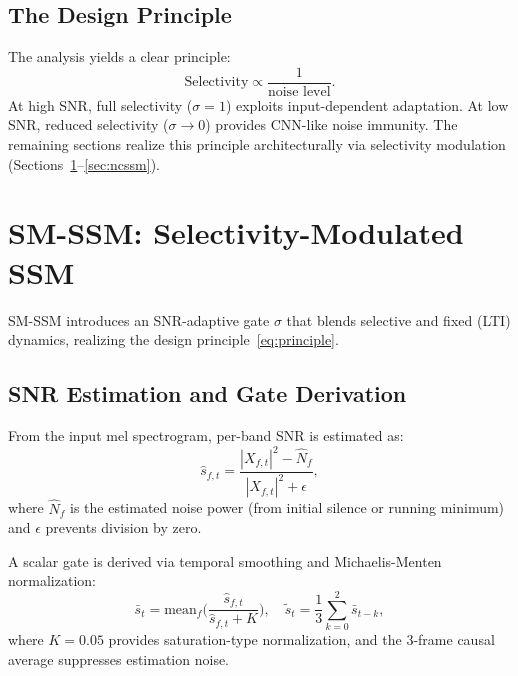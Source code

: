 \documentclass[journal]{IEEEtran}
\begin{document}
\subsection{The Design Principle}

The analysis yields a clear principle:
\begin{equation}
\boxed{\text{Selectivity} \propto \frac{1}{\text{noise level}}.}
\label{eq:principle}
\end{equation}
At high SNR, full selectivity ($\sigma = 1$) exploits input-dependent adaptation.
At low SNR, reduced selectivity ($\sigma \to 0$) provides CNN-like noise immunity.
The remaining sections realize this principle architecturally via selectivity modulation (Sections~\ref{sec:smssm}--\ref{sec:ncssm}).


\section{SM-SSM: Selectivity-Modulated SSM}
\label{sec:smssm}

SM-SSM introduces an SNR-adaptive gate $\sigma$ that blends selective and fixed (LTI) dynamics, realizing the design principle~\eqref{eq:principle}.

\subsection{SNR Estimation and Gate Derivation}

From the input mel spectrogram, per-band SNR is estimated as:
\begin{equation}
\hat{s}_{f,t} = \frac{|X_{f,t}|^2 - \hat{N}_f}{|X_{f,t}|^2 + \epsilon},
\label{eq:snr_est}
\end{equation}
where $\hat{N}_f$ is the estimated noise power (from initial silence or running minimum) and $\epsilon$ prevents division by zero.

A scalar gate is derived via temporal smoothing and Michaelis-Menten normalization:
\begin{equation}
\bar{s}_t = \text{mean}_f\!\Big(\frac{\hat{s}_{f,t}}{\hat{s}_{f,t} + K}\Big), \quad
\tilde{s}_t = \frac{1}{3}\sum_{k=0}^{2}\bar{s}_{t-k},
\label{eq:snr_smooth}
\end{equation}
where $K = 0.05$ provides saturation-type normalization, and the 3-frame causal average suppresses estimation noise.
\end{document}
